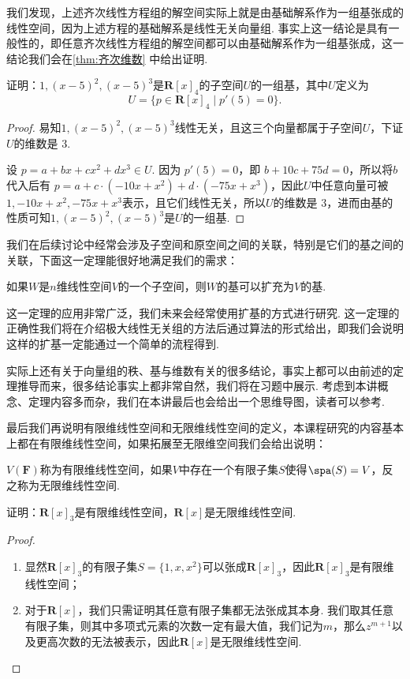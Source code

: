 我们发现，上述齐次线性方程组的解空间实际上就是由基础解系作为一组基张成的线性空间，因为上述方程的基础解系是线性无关向量组. 事实上这一结论是具有一般性的，即任意齐次线性方程组的解空间都可以由基础解系作为一组基张成，这一结论我们会在\autoref{thm:齐次维数} 中给出证明.

\begin{example}{}{}
    证明：$1,(x-5)^2,(x-5)^3$是$\mathbf{R}[x]_4$的子空间$U$的一组基，其中$U$定义为
    \[U=\{p\in\mathbf{R}[x]_4 \mid p'(5)=0\}.\]
\end{example}

\begin{proof}
    易知$1,(x-5)^2,(x-5)^3$线性无关，且这三个向量都属于子空间$U$，下证$U$的维数是 3.

    设 $p = a + bx + cx^2 + dx^3 \in U$. 因为 $p'(5) = 0$，即 $b + 10c +75d = 0$，所以将$b$代入后有 $p = a + c·(-10x + x^2) + d·(-75x + x^3)$，因此$U$中任意向量可被$1, -10x + x^2, -75x + x^3$表示，且它们线性无关，所以$U$的维数是 3，进而由基的性质可知$1,(x-5)^2,(x-5)^3$是$U$的一组基.
\end{proof}

我们在后续讨论中经常会涉及子空间和原空间之间的关联，特别是它们的基之间的关联，下面这一定理能很好地满足我们的需求：
\begin{theorem}{}{}
    如果$W$是$n$维线性空间$V$的一个子空间，则$W$的基可以扩充为$V$的基.
\end{theorem}
这一定理的应用非常广泛，我们未来会经常使用扩基的方式进行研究. 这一定理的正确性我们将在介绍极大线性无关组的方法后通过算法的形式给出，即我们会说明这样的扩基一定能通过一个简单的流程得到.

实际上还有关于向量组的秩、基与维数有关的很多结论，事实上都可以由前述的定理推导而来，很多结论事实上都非常自然，我们将在习题中展示. 考虑到本讲概念、定理内容多而杂，我们在本讲最后也会给出一个思维导图，读者可以参考.

最后我们再说明有限维线性空间和无限维线性空间的定义，本课程研究的内容基本上都在有限维线性空间，如果拓展至无限维空间我们会给出说明：
\begin{definition}{}{}
    $V(\mathbf{F})$称为有限维线性空间，如果$V$中存在一个有限子集$S$使得$\spa(S)=V$，反之称为无限维线性空间.
\end{definition}

\begin{example}{}{}
    证明：$\mathbf{R}[x]_3$是有限维线性空间，$\mathbf{R}[x]$是无限维线性空间.
\end{example}

\begin{proof}
    \begin{enumerate}
        \item 显然$\mathbf{R}[x]_3$的有限子集$S=\{1,x,x^2\}$可以张成$\mathbf{R}[x]_3$，因此$\mathbf{R}[x]_3$是有限维线性空间；

        \item 对于$\mathbf{R}[x]$，我们只需证明其任意有限子集都无法张成其本身. 我们取其任意有限子集，则其中多项式元素的次数一定有最大值，我们记为$m$，那么$z^{m+1}$以及更高次数的无法被表示，因此$\mathbf{R}[x]$是无限维线性空间.
    \end{enumerate}
\end{proof}

